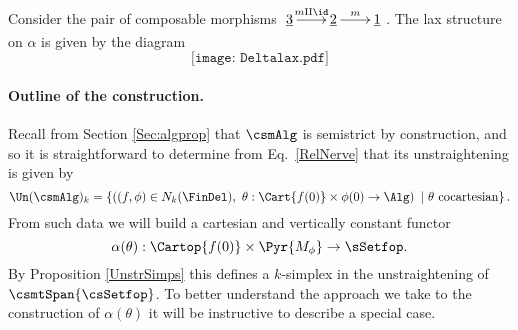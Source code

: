 \documentclass[a4paper]{article}
\numberwithin{equation}{section}
\begin{document}
\begin{exam}
Consider the pair of composable morphisms $\xymatrixcolsep{1.7pc}\xymatrix{\underline{3} \ar[r]^-{m \amalg \id} & \underline{2} \ar[r]^-{m} & \underline{1}}$. The lax structure on $\alpha$ is given by the diagram
\begin{equation*}
 \texttt{[image: Deltalax.pdf]} 
\end{equation*}
\end{exam}


\paragraph{Outline of the construction.} Recall from Section \ref{Sec:algprop} that $\csmAlg$ is semistrict by construction, and so it is straightforward to determine from Eq.~\ref{RelNerve} that its unstraightening is given by
\begin{equation*}
 \Un(\csmAlg)_k = \left\{ \left( (f,\phi)\in N_k(\FinDel), \ \theta:\Cart{f(0)}\times\phi(0) \to \Alg\right) \ | \ \theta \ {\rm cocartesian}\right\}.
\end{equation*}
From such data we will build a cartesian and vertically constant functor 
\begin{equation*}
\alpha(\theta):\Cartop{f(0)}\times \Pyr{M_\phi} \to \sSetfop.
\end{equation*}
By Proposition \ref{UnstrSimps} this defines a $k$-simplex in the unstraightening of $\csmtSpan{\csSetfop}$. To better understand the approach we take to the construction of $\alpha(\theta)$ it will be instructive to describe a special case.
\end{document}
